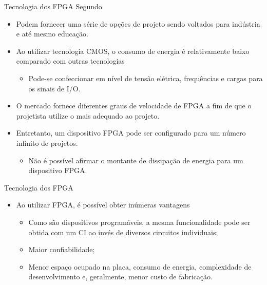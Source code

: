    \begin{frame}{Tecnologia dos FPGA} \vspace{-1em}
      Segundo \cite{tocci2003sistemas}
      \begin{itemize}
         \setlength{\itemsep}{1.5em}
         \item Podem fornecer uma série de opções de projeto sendo voltados para indústria e até mesmo educação.
          
         \item Ao utilizar tecnologia CMOS, o consumo de energia é relativamente baixo comparado com outras tecnologias
         \begin{itemize}
            \item Pode-se confeccionar em nível de tensão elétrica, frequências e cargas para os sinais de I/O. 
         \end{itemize}
      
         \item O mercado fornece diferentes graus de velocidade de FPGA a fim de que o projetista utilize o mais adequado ao projeto. 
         
         \item Entretanto, um dispositivo FPGA pode ser configurado para um número infinito de projetos.
         \begin{itemize}
            \item Não é possível afirmar o montante de dissipação de energia para um dispositivo FPGA.
         \end{itemize}
         
      \end{itemize}
   \end{frame}

   \begin{frame}{Tecnologia dos FPGA} \vspace{-1em}
      
      \begin{itemize}
         \setlength{\itemsep}{1.2em}
         \item Ao utilizar FPGA, é possível obter inúmeras vantagens \cite{tocci2003sistemas, Plessl2003}
         \begin{itemize}
            \setlength{\itemsep}{1.5em}
            \item Como são dispositivos programáveis, a mesma funcionalidade pode ser obtida com um CI ao invés de diversos circuitos individuais;
               \bigskip
            \item Maior confiabilidade;
            \item Menor espaço ocupado na placa, consumo de energia, complexidade de desenvolvimento e, geralmente, menor custo de fabricação.
         \end{itemize}
      \end{itemize}
   \end{frame}

